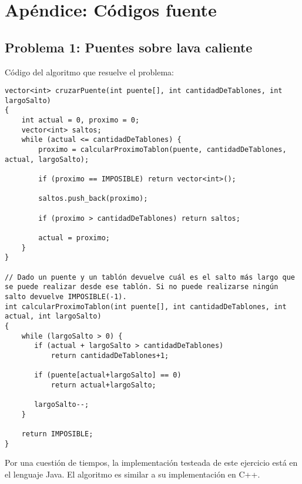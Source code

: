 \section{Apéndice: Códigos fuente}

\subsection{Problema 1: Puentes sobre lava caliente}

Código del algoritmo que resuelve el problema:
\begin{lstlisting}[frame=single]
vector<int> cruzarPuente(int puente[], int cantidadDeTablones, int largoSalto)
{
    int actual = 0, proximo = 0;
    vector<int> saltos;
    while (actual <= cantidadDeTablones) {
        proximo = calcularProximoTablon(puente, cantidadDeTablones, actual, largoSalto);

        if (proximo == IMPOSIBLE) return vector<int>();

        saltos.push_back(proximo);

        if (proximo > cantidadDeTablones) return saltos;

        actual = proximo;
    }
}

// Dado un puente y un tablón devuelve cuál es el salto más largo que se puede realizar desde ese tablón. Si no puede realizarse ningún salto devuelve IMPOSIBLE(-1).
int calcularProximoTablon(int puente[], int cantidadDeTablones, int actual, int largoSalto)
{
    while (largoSalto > 0) {
       if (actual + largoSalto > cantidadDeTablones) 
           return cantidadDeTablones+1;
       
       if (puente[actual+largoSalto] == 0)
           return actual+largoSalto;
           
       largoSalto--;
    }

    return IMPOSIBLE;
}
\end{lstlisting}

Por una cuesti\'on de tiempos, la implementación testeada de este ejercicio está en el lenguaje Java. El algoritmo es similar a su implementaci\'on en C++.


